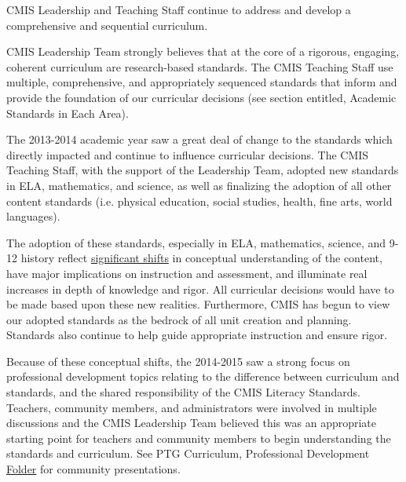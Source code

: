 \begin{findings}
CMIS Leadership and Teaching Staff continue to address and develop a comprehensive and sequential curriculum. 

\href{https://drive.google.com/drive/folders/0B71_pYxcTLo-NGJ4N0RQWXRTNE0?usp=sharing}{}

CMIS Leadership Team strongly believes that at the core of a rigorous, engaging, coherent curriculum are research-based standards. The  CMIS Teaching Staff use multiple, comprehensive, and appropriately sequenced standards that inform and provide the foundation of our curricular decisions (see section entitled, Academic Standards in Each Area). 

The 2013-2014 academic year saw a great deal of change to the standards which directly impacted and continue to influence curricular decisions. The CMIS Teaching Staff, with the support of the Leadership Team, adopted new standards in ELA, mathematics, and science, as well as finalizing the adoption of all other content standards (i.e. physical education, social studies, health, fine arts, world languages). 

The adoption of these standards, especially in ELA, mathematics, science, and 9-12 history  reflect \href{https://docs.google.com/a/cmis.ac.th/document/d/1XkW4kx-s2f5rP1zWNLqi14WBQ9fHp9aFRP2op2RPRQE/edit?usp=sharing}{significant shifts} in conceptual understanding of the content, have major implications on instruction and assessment, and illuminate real increases in depth of knowledge and rigor. All curricular decisions would have to be made based upon these new realities. Furthermore, CMIS has begun to view our adopted standards as the bedrock of all unit creation and planning. Standards also continue to help guide appropriate instruction and ensure rigor. 

Because of these conceptual shifts, the 2014-2015 saw a strong focus on professional development topics relating to the difference between curriculum and standards, and the shared responsibility of the CMIS Literacy Standards. Teachers, community members, and administrators were involved in multiple discussions and the CMIS Leadership Team believed this was an appropriate starting point for teachers and community members to begin understanding the standards and curriculum. See PTG Curriculum, Professional Development \href{https://drive.google.com/a/cmis.ac.th/folderview?id=0ByVFfrm0zfolWE0yenprdktGVlk&usp=sharing}{Folder} for community presentations. 


\end{findings}
